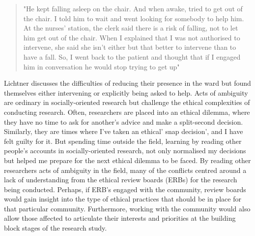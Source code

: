 \begin{quote}"He kept falling asleep on the chair. And when awake, tried to get out of the chair. I told him to wait and went looking for somebody to help him. At the nurses' station, the clerk said there is a risk of falling, not to let him get out of the chair. When I explained that I was not authorised to intervene, she said she isn't either but that better to intervene than to have a fall. So, I went back to the patient and thought that if I engaged him in conversation he would stop trying to get up" \citep{lichtner_everyday_2014}
\end{quote}

Lichtner discusses the difficulties of reducing their presence in the ward but found themselves either intervening or explicitly being asked to help. Acts of ambiguity are ordinary in socially-oriented research but challenge the ethical complexities of conducting research. Often, researchers are placed into an ethical dilemma, where they have no time to ask for another's advice and make a split-second decision. Similarly, they are times where I've taken an ethical' snap decision', and I have felt guilty for it. But spending time outside the field, learning by reading other people's accounts in socially-oriented research, not only normalised my decisions but helped me prepare for the next ethical dilemma to be faced. By reading other researchers acts of ambiguity in the field, many of the conflicts centred around a lack of understanding from the ethical review boards (ERBs) for the research being conducted. Perhaps, if ERB's engaged with the community, review boards would gain insight into the type of ethical practices that should be in place for that particular community. Furthermore, working with the community would also allow those affected to articulate their interests and priorities at the building block stages of the research study.

